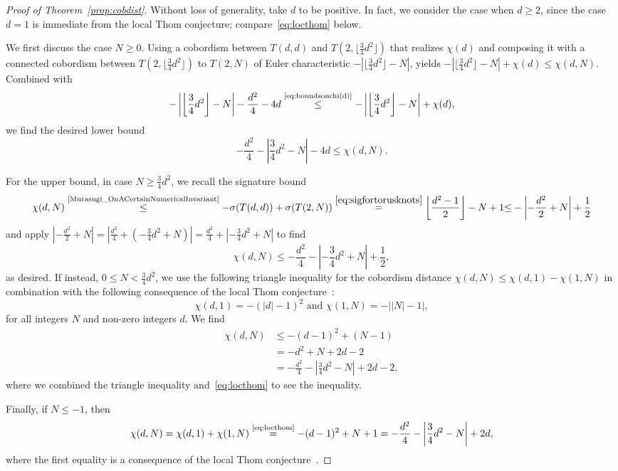 \begin{proof}[Proof of Theorem~\ref{prop:cobdist}]
Without loss of generality, take $d$ to be positive. In fact, we consider the case when $d\geq 2$, since the case $d=1$ is immediate from the local Thom conjecture; compare~\eqref{eq:locthom} below.

We first discuss the case $N\geq0$. Using a cobordism between $T(d,d)$ and $T(2,\lfloor \frac{3}{4}d^2\rfloor)$ that realizes $\chi(d)$ and composing it with a connected cobordism between $T(2,\lfloor \frac{3}{4}d^2\rfloor)$ to $T(2,N)$ of Euler characteristic $-|\lfloor \frac{3}{4}d^2\rfloor-N|$, yields $-|\lfloor \frac{3}{4}d^2\rfloor-N|+\chi(d)\leq\chi(d,N)$. Combined with
\[
-\left|\left\lfloor \frac{3}{4}d^2\right\rfloor-N\right|-\frac{d^2}{4}-4d
\overset{\text{\eqref{eq:boundsonchi(d)}}}{\leq}-\left|\left\lfloor \frac{3}{4}d^2\right\rfloor-N\right|+\chi(d),
\]
we find the desired lower bound
\[
-\frac{d^2}{4}-\left|\frac{3}{4}d^2-N\right|-4d
\leq\chi(d,N).
\]

For the upper bound, in case $N\geq \frac{3}{4}d^2$, we recall the signature bound
\[
\chi(d,N)\overset{\text{\cite{Murasugi_OnACertainNumericalInvariant}}}{\leq} -\sigma(T(d,d))+\sigma(T(2,N))\overset{\eqref{eq:sigfortorusknots}}{=} \left\lfloor\frac{d^2-1}{2}\right\rfloor-N+1{\leq} -\left|-\frac{d^2}{2}+N\right|+\frac{1}{2}
\]
and apply $|-\frac{d^2}{2}+N|=|\frac{d^2}{4}+(-\frac{3}{4}d^2+N)|= \frac{d^2}{4}+|-\frac{3}{4}d^2+N|$ to find
\[
\chi(d,N)\leq -\frac{d^2}{4}-\left|-\frac{3}{4}d^2+N\right|+\frac{1}{2},
\]
as desired. If instead, $0\leq N< \frac{3}{4}d^2$, we use the following triangle inequality for the cobordism distance $\chi(d,N)\leq \chi(d,1) - \chi(1,N)$ in combination with the following consequence of the local Thom conjecture~\cite[Corollary~1.3]{KronheimerMrowka_Gaugetheoryforemb}:
\begin{equation}\label{eq:locthom}
\chi(d,1)=-(|d|-1)^2\text{ and } \chi(1,N)=-\left||N|-1\right|,
\end{equation}
for all integers $N$ and non-zero integers $d$. We find
\begin{align*}
\chi(d,N)&\leq-(d-1)^2+(N-1)
\\&= -d^2+N+2d-2
\\&=-\frac{d^2}{4}-\left|\frac{3}{4}d^2-N\right|+2d-2,
\end{align*}
where we combined the triangle inequality and~\eqref{eq:locthom} to see the inequality.

Finally, if $N\leq -1$, then
\[
\chi(d,N)= \chi(d,1)+\chi(1,N)\overset{\text{\eqref{eq:locthom}}}{=}-(d-1)^2+N+1 =-\frac{d^2}{4}-\left|\frac{3}{4}d^2-N\right|+2d,
\]
where the first equality is a consequence of the local Thom conjecture~\cite[Corollary~1.3]{KronheimerMrowka_Gaugetheoryforemb}.
\end{proof}

